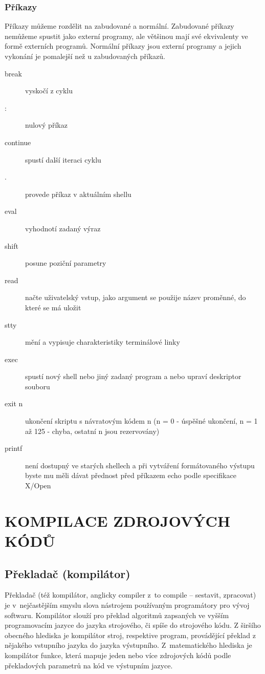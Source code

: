 \documentclass[a4paper,12pt]{article}
\newcommand{\upc}[1]{\uppercase{#1}}
\begin{document}
\subsubsection{Příkazy}
Příkazy můžeme rozdělit na zabudované a normální. Zabudované příkazy nemůžeme spustit jako externí programy, ale většinou mají své ekvivalenty ve formě externích programů. Normální příkazy jsou externí programy a jejich vykonání je pomalejší než u zabudovaných příkazů\cite{ABC_SBASH}.
\begin{description}
 \item[break] vyskočí z cyklu
 \item[:] nulový příkaz
 \item[continue] spustí další iteraci cyklu
 \item[.] provede příkaz v aktuálním shellu
 \item[eval] vyhodnotí zadaný výraz
 \item[shift] posune poziční parametry
 \item[read] načte uživatelský vstup, jako argument se použije název proměnné, do které se má uložit
 \item[stty] mění a vypisuje charakteristiky terminálové linky
 \item[exec] spustí nový shell nebo jiný zadaný program a nebo upraví deskriptor souboru
 \item[exit n] ukončení skriptu s návratovým kódem n (n = 0 - úspěšné ukončení, n = 1 až 125 - chyba, ostatní n jsou rezervovány)
 \item[printf] není dostupný ve starých shellech a při vytváření formátovaného výstupu byste mu měli dávat přednost před příkazem echo podle specifikace X/Open
 \end{description}

%
%
%
%



\section{\upc{Kompilace zdrojových kódů}}
\subsection{Překladač (kompilátor)}
Překladač (též kompilátor, anglicky compiler z~to compile – sestavit, zpracovat) je v~nejčastějším smyslu slova nástrojem používaným programátory pro vývoj softwaru. Kompilátor slouží pro překlad algoritmů zapsaných ve vyšším programovacím jazyce do jazyka strojového, či spíše do strojového kódu. Z širšího obecného hlediska je kompilátor stroj, respektive program, provádějící překlad z nějakého vstupního jazyka do jazyka výstupního. Z~matematického hlediska je kompilátor funkce, která mapuje jeden nebo více zdrojových kódů podle překladových parametrů na kód ve výstupním jazyce.~\cite{Wkom}
\end{document}
